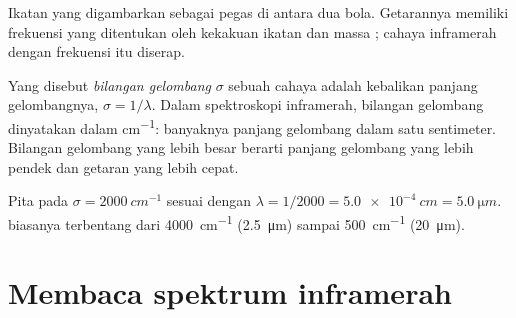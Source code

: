 \begin{omfigure}

{\small Ikatan yang digambarkan sebagai pegas di antara dua bola.
Getarannya memiliki frekuensi yang ditentukan oleh kekakuan ikatan dan
massa ; cahaya inframerah dengan frekuensi itu diserap.}
\end{omfigure}

\begin{definition}\label{def:g11:infrared:wavenumber}
Yang disebut \emph{bilangan gelombang}
$\sigma$ sebuah cahaya adalah kebalikan panjang gelombangnya,
$\sigma = 1/\lambda$. Dalam spektroskopi inframerah, bilangan gelombang
dinyatakan dalam \si{cm^{-1}}: banyaknya panjang gelombang dalam satu
sentimeter. Bilangan gelombang yang lebih besar berarti panjang
gelombang yang lebih pendek dan getaran yang lebih cepat.
\end{definition}

\begin{example}\label{ex:g11:infrared:convert}
Pita pada $\sigma = \qty{2000}{cm^{-1}}$ sesuai dengan
$\lambda = 1/2000 = \qty{5.0e-4}{cm} = \qty{5.0}{\micro m}$.  biasanya terbentang dari \qty{4000}{cm^{-1}}
(\qty{2.5}{\micro m}) sampai \qty{500}{cm^{-1}} (\qty{20}{\micro m}).
\end{example}

\section{Membaca spektrum inframerah}

